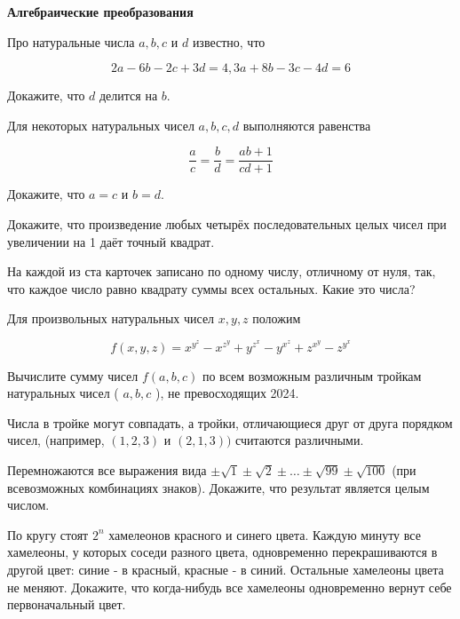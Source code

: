 \centerline{\bf \Huge Алгебраические преобразования}

\begin{flushright}
        \scriptsize{}
\end{flushright}

Про натуральные числа $a, b, c$ и $d$ известно, что

$$
2 a-6 b-2 c+3 d=4,3 a+8 b-3 c-4 d=6
$$


Докажите, что $d$ делится на $b$.

Для некоторых натуральных чисел $a, b, c, d$ выполняются равенства

$$
\frac{a}{c}=\frac{b}{d}=\frac{a b+1}{c d+1}
$$


Докажите, что $a=c$ и $b=d$.

Докажите, что произведение любых четырёх последовательных целых чисел при увеличении на 1 даёт точный квадрат.

На каждой из ста карточек записано по одному числу, отличному от нуля, так, что каждое число равно квадрату суммы всех остальных. Какие это числа?

Для произвольных натуральных чисел $x, y, z$ положим

$$
f(x, y, z)=x^{y^z}-x^{z^y}+y^{z^x}-y^{x^z}+z^{x^y}-z^{y^x}
$$


Вычислите сумму чисел $f(a, b, c)$ по всем возможным различным тройкам натуральных чисел ( $a, b, c$ ), не превосходящих 2024.

Числа в тройке могут совпадать, а тройки, отличающиеся друг от друга порядком чисел, (например, $(1,2,3)$ и $(2,1,3))$ считаются различными.

Перемножаются все выражения вида $\pm \sqrt{1} \pm \sqrt{2} \pm \ldots \pm \sqrt{99} \pm \sqrt{100}$ (при всевозможных комбинациях знаков). Докажите, что результат является целым числом.

По кругу стоят $2^n$ хамелеонов красного и синего цвета. Каждую минуту все хамелеоны, у которых соседи разного цвета, одновременно перекрашиваются в другой цвет: синие - в красный, красные - в синий. Остальные хамелеоны цвета не меняют. Докажите, что когда-нибудь все хамелеоны одновременно вернут себе первоначальный цвет.